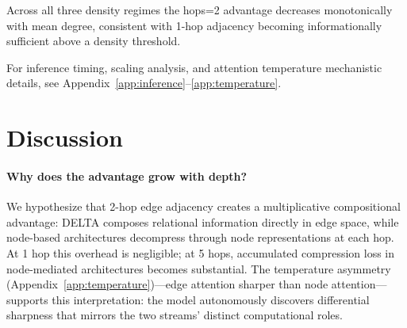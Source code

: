 \documentclass{article}
\begin{document}
\begin{table}[h]
\small
\centering
\caption{Cross-density summary: hops=2 vs.\ hops=1 on 3p MRR (Phases 66--68). The gap decreases monotonically with mean degree. Absolute 3p values are not directly comparable across rows.}
\label{tab:cross_density}
\end{table}

Across all three density regimes the hops=2 advantage decreases monotonically with mean degree, consistent with 1-hop adjacency becoming informationally sufficient above a density threshold.

For inference timing, scaling analysis, and attention temperature mechanistic details, see Appendix~\ref{app:inference}--\ref{app:temperature}.

\section{Discussion}
\label{sec:discussion}

\paragraph{Why does the advantage grow with depth?}
We hypothesize that 2-hop edge adjacency creates a multiplicative compositional advantage: DELTA composes relational information directly in edge space, while node-based architectures decompress through node representations at each hop. At 1 hop this overhead is negligible; at 5 hops, accumulated compression loss in node-mediated architectures becomes substantial. The temperature asymmetry (Appendix~\ref{app:temperature})---edge attention sharper than node attention---supports this interpretation: the model autonomously discovers differential sharpness that mirrors the two streams' distinct computational roles.
\end{document}
